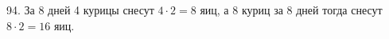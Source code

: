 94. За 8 дней 4 курицы снесут $4\cdot2=8$ яиц, а 8 куриц за 8 дней тогда снесут $8\cdot2=16$ яиц.\\
